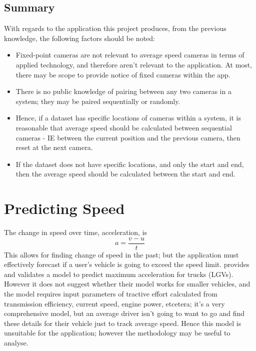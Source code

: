 \documentclass[11pt, a4paper, notitlepage]{report}
\begin{document}
\subsection{Summary}
With regards to the application this project produces, from the previous knowledge, the following factors should be noted:
\begin{itemize}
    \item Fixed-point cameras are not relevant to average speed cameras in terms of applied technology, and therefore aren't relevant to the application. At most, there may be scope to provide notice of fixed cameras within the app.
    \item There is no public knowledge of pairing between any two cameras in a system; they may be paired sequentially or randomly.
    \item Hence, if a dataset has specific locations of cameras within a system, it is reasonable that average speed should be calculated between sequential cameras - IE between the current position and the previous camera, then reset at the next camera.
    \item If the dataset does not have specific locations, and only the start and end, then the average speed should be calculated between the start and end.
\end{itemize}

\section{Predicting Speed}
The change in speed over time, acceleration, is
\begin{equation}\label{eq:Accel}
    a = \frac{v - u}{t}
\end{equation}
This allows for finding change of speed in the past; but the application must effectively forecast if a user's vehicle is going to exceed the speed limit. \citet{accelerationForecasting} provides and validates a model to predict maximum acceleration for trucks (LGVs). However it does not suggest whether their model works for smaller vehicles, and the model requires input parameters of tractive effort calculated from transmission efficiency, current speed, engine power, etcetera; it's a very comprehensive model, but an average driver isn't going to want to go and find these details for their vehicle just to track average speed. Hence this model is unsuitable for the application; however the methodology may be useful to analyse.  
\end{document}

